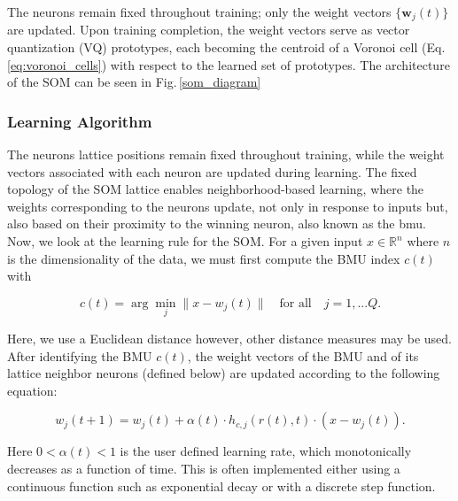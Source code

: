 \noindent The neurons remain fixed throughout training; only the weight vectors $\{\mathbf{w}_j(t)\}$ are updated. Upon training completion, the weight vectors serve as vector quantization (VQ) prototypes, each becoming the centroid of a Voronoi cell (Eq. \ref{eq:voronoi_cells})
with respect to the learned set of prototypes. The architecture of the SOM can be seen in Fig.\,\ref{som_diagram}

\subsubsection*{Learning Algorithm}

The neurons lattice positions remain fixed throughout training, while the weight vectors associated with each neuron are updated during learning. The fixed topology of the SOM lattice enables neighborhood-based learning, where the weights corresponding to the neurons update, not only in response to inputs but, also based on their proximity to the winning neuron, also known as the \acrfull{bmu}. Now, we look at the learning rule for the SOM. For a given input $x \in \mathbb{R}^{n}$ where $n$ is the dimensionality of the data, we must first compute the BMU index $c(t)$ with

\begin{equation}
c(t) = \arg\min_{j} \|x - w_j(t)\| \quad \text{for all} \quad  j=1, ... Q.  
\label{eq:winning_neuron}
\end{equation}

Here, we use a Euclidean distance however, other distance measures may be used. After identifying the BMU $c(t)$, the weight vectors of the BMU and of its lattice neighbor neurons (defined below) are updated according to the following equation:

\begin{equation}
w_j(t+1) = w_j(t) + \alpha(t) \cdot h_{c,j}(r(t),t) \cdot (x - w_j(t)).
\label{eq:weight_update}
\end{equation}


Here $0 < \alpha(t) < 1$ is the user defined learning rate, which monotonically decreases as a function of time. This is often implemented either using a continuous function such as exponential decay or with a discrete step function.

